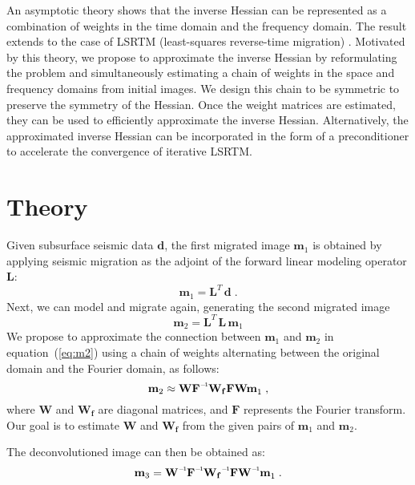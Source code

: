 An asymptotic theory \cite[]{miller1987,bleistein1987} shows that the inverse Hessian can be represented as a combination of weights in the time domain and the frequency domain. The result extends to the case of LSRTM (least-squares reverse-time migration) \cite[]{hou15,hou16}. Motivated by this theory,
we propose to approximate the inverse Hessian by reformulating the problem and simultaneously estimating a chain of weights in the space and frequency domains from initial images. We design this chain to be symmetric to preserve the symmetry of the Hessian.
Once the weight matrices are estimated, they can be used to efficiently approximate the inverse Hessian. Alternatively, the approximated inverse Hessian can be incorporated in the form of a preconditioner to accelerate the convergence of iterative LSRTM.


\section{Theory}
Given subsurface seismic data $\mathbf{d}$, the first migrated image $\mathbf{m}_1$ is obtained by applying seismic migration as the adjoint of the forward linear modeling operator $\mathbf{L}$:
\begin{equation}
\label{eq:m1}
    \mathbf{m}_1=\mathbf{L}^{T}\,\mathbf{d}\;.
\end{equation}
Next, we can model and migrate again, generating the second migrated image
\begin{equation}
\label{eq:m2}
    \mathbf{m}_2=\mathbf{L}^{T}\,\mathbf{L\,m}_1
\end{equation}
We propose to approximate the connection between $\mathbf{m}_1$ and $\mathbf{m}_2$ in equation~(\ref{eq:m2}) using a chain of weights alternating between the original domain and the Fourier domain, as follows:
\begin{equation}
    \label{eq:wfw}
    \mathbf{m}_2 \approx \mathbf{W\inv{F}W_{f}FW m}_1\;,
\end{equation}
where $\mathbf{W}$ and $\mathbf{W_f}$ are diagonal matrices, and $\mathbf{F}$ represents the Fourier transform. Our goal is to estimate $\mathbf{W}$ and $\mathbf{W_f}$ from the given pairs of $\mathbf{m}_1$ and $\mathbf{m}_2$.

The deconvolutioned image can then be obtained as:
\begin{equation}
 \mathbf{
m}_{3} = 
\mathbf{\inv{W}\inv{F}\inv{W_f}F\inv{W} m}_1\;.
\label{lsmig}
\end{equation}
 


